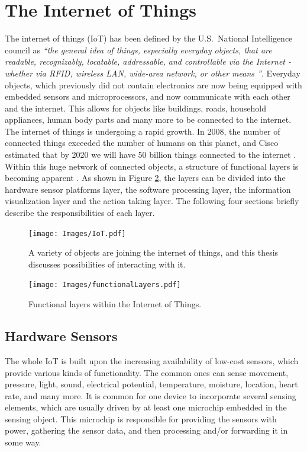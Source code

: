 \section{The Internet of Things}
\label{sec:internetOfThings}
The internet of things (IoT) has been defined by the U.S.\ National Intelligence council as \emph{``the general idea of things, especially everyday objects, that are readable, recognizably, locatable, addressable, and controllable via the Internet - whether via RFID, wireless LAN, wide-area network, or other means \cite{disruptiveTechnologies}''}.
Everyday objects, which previously did not contain electronics are now being equipped with embedded sensors and microprocessors, and now communicate with each other and the internet. 
This allows for objects like buildings, roads, household appliances, human body parts and many more to be connected to the internet. 
The internet of things is undergoing a rapid growth. 
In 2008, the number of connected things exceeded the number of humans on this planet, and Cisco estimated that by 2020 we will have 50 billion things connected to the internet \cite{evans12}. 
Within this huge network of connected objects, a structure of functional layers is becoming apparent \cite{swan12}. 
As shown in Figure \ref{fig:functionalLayers}, the layers can be divided into the hardware sensor platforms layer, the software processing layer, the information visualization layer and the action taking layer. 
The following four sections briefly describe the responsibilities of each layer.
\begin{figure}[!t]
\centering
\texttt{[image: Images/IoT.pdf]}
\caption{A variety of objects are joining the internet of things, and this thesis discusses possibilities of interacting with it.}
\label{fig:iot}
\end{figure}

\begin{figure}[!t]
\centering
\texttt{[image: Images/functionalLayers.pdf]}
\caption{Functional layers within the Internet of Things.}
\label{fig:functionalLayers}
\end{figure}

\subsection{Hardware Sensors}
\label{sec:hardwareSensors}
The whole IoT is built upon the increasing availability of low-cost sensors, which provide various kinds of functionality.
The common ones can sense movement, pressure, light, sound, electrical potential, temperature, moisture, location, heart rate, and many more.
It is common for one device to incorporate several sensing elements, which are usually driven by at least one microchip embedded in the sensing object.
This microchip is responsible for providing the sensors with power, gathering the sensor data, and then processing and/or forwarding it in some way.

